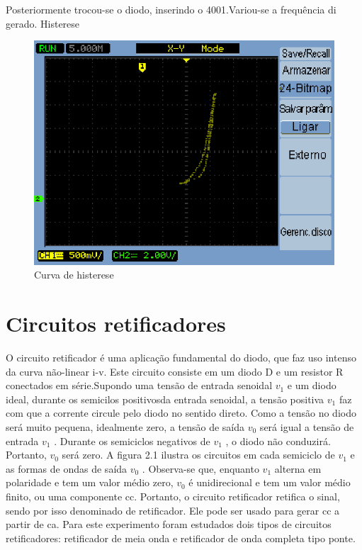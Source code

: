 \documentclass[a4paper]{article} %
\renewcommand{\thefigure}{\thesection.\arabic{figure}}
\begin{document}
Posteriormente trocou-se o diodo, inserindo o 4001.Variou-se a frequência di gerado. Histerese

\begin{figure}[h]
\begin{centering}
\includegraphics[scale=0.7]{Imagens/3.1.opcional/opcio} \caption{Curva de histerese \label{fig:q1-his}}
\par\end{centering}
\end{figure}

\renewcommand{\thefigure}{\thesubsection.\arabic{figure}}

\newpage
\section{Circuitos retificadores}
 \setcounter{figure}{0}
O circuito retificador é uma aplicação fundamental do diodo, que faz uso intenso da curva não-linear i-v. Este circuito consiste em um diodo D e um resistor R conectados em série.Supondo uma tensão de entrada senoidal  $v_1$ e um diodo ideal, durante os semicilos positivosda entrada senoidal, a tensão positiva  $v_1$     faz com que a corrente circule pelo diodo no sentido
direto. Como a tensão no diodo será muito pequena, idealmente zero, a tensão de saída  $v_0$ será igual a tensão de entrada      $v_1$     . Durante os semiciclos negativos de    $v_1$    , o diodo não conduzirá. Portanto,   $v_0$     será zero. A figura 2.1 ilustra os circuitos em cada semiciclo de   $v_1$  e as formas de ondas de saída  $v_0$      .
        Observa-se que, enquanto  $v_1$        alterna em polaridade e tem um valor médio zero,     $v_0$   é unidirecional e tem um valor médio finito, ou uma componente cc. Portanto, o circuito retificador retifica o sinal, sendo por isso denominado de retificador. Ele pode ser usado para gerar cc a partir de ca.
         Para este experimento foram estudados dois tipos de circuitos retificadores: retificador
de meia onda e retificador de onda completa tipo ponte.
      
\end{document}
